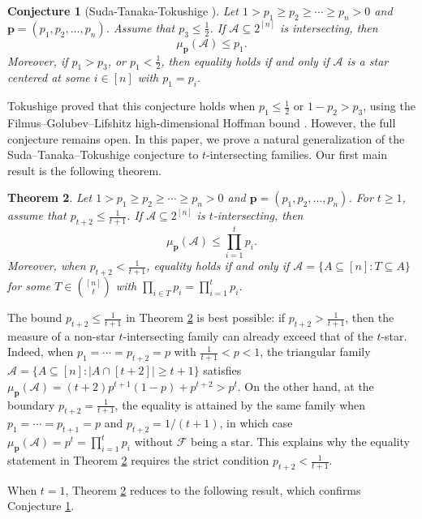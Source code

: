 \documentclass[11pt]{article}
\newtheorem{theorem}{Theorem}[section]
\newtheorem{conjecture}[theorem]{Conjecture}
\begin{document}
 \begin{conjecture}[Suda-Tanaka-Tokushige \cite{S17}]\label{S17}
Let $1 > p_1 \ge p_2 \ge \cdots \ge p_n > 0$ and $\mathbf{p}=(p_1,p_2,\ldots,p_n)$. 
Assume that  $p_3 \leq \frac{1}{2}$. 
If $\mathcal{A} \subseteq 2^{[n]}$ is intersecting, then
$$
\mu_{\mathbf{p}}(\mathcal{A}) \le p_1 .
$$
Moreover, if $p_1 > p_3$, or $p_1 < \tfrac12$, then equality holds if and only if $\mathcal{A}$ is a  star centered at some $i \in [n]$ with $p_1 = p_i$.
\end{conjecture}



Tokushige \cite{T22} proved that this conjecture holds when $p_1\leq \frac{1}{2}$ or $1-p_2>p_3$, using the Filmus–Golubev–Lifshitz high-dimensional Hoffman bound \cite{F21}. However, the full conjecture remains open.
In this paper, we prove  a natural generalization of the Suda–Tanaka–Tokushige conjecture to $t$-intersecting families. Our first main result is the following theorem.

 \begin{theorem}\label{Th2}
Let $1 > p_1 \ge p_2 \ge \cdots \ge p_n > 0$ and $\textbf{p}=(p_1,p_2,\ldots,p_n)$. 
For $t\geq 1$, assume that $p_{t+2} \leq \frac{1}{t+1}$. 
If $\mathcal{A} \subseteq 2^{[n]}$ is $t$-intersecting, then
$$
\mu_{\mathbf{p}}(\mathcal{A}) \le \prod_{i=1}^t p_i.
$$
Moreover, when $p_{t+2}  < \frac{1}{t+1}$,  equality holds if and only if $\mathcal{A}=\{A\subseteq [n]: T\subseteq A\}$ for some $T\in \binom{[n]}{t}$ with $\prod_{i\in T} p_i=\prod_{i=1}^t p_i$. 
\end{theorem}

The bound $p_{t+2}\le \frac{1}{t+1}$ in Theorem \ref{Th2} is best possible: if $p_{t+2}> \frac{1}{t+1}$, then the measure of a non-star $t$-intersecting family can already exceed that of the $t$-star. Indeed, when $p_1=\cdots=p_{t+2}=p$ with $\frac{1}{t+1}<p<1$, the triangular family
$
\mathcal{A}=\{A\subseteq[n]: |A\cap[t+2]|\ge t+1\}
$
satisfies $\mu_{\mathbf{p}}(\mathcal{A})=(t+2)p^{t+1}(1-p)+p^{t+2}>p^t$. 
On the other hand,
at the boundary $p_{t+2}=\frac{1}{t+1}$, the equality is attained by the same family when $p_1=\cdots=p_{t+1}=p$ and $p_{t+2}=1/(t+1)$, in which case $\mu_{\mathbf{p}}(\mathcal{A})=p^t=\prod_{i=1}^t p_i$ without $\mathcal{F}$ being a star. This explains why the equality statement in Theorem \ref{Th2} requires the strict condition $p_{t+2}<\frac{1}{t+1}$.

When $t=1$, Theorem \ref{Th2} reduces to the following result, which confirms Conjecture \ref{S17}.
\end{document}
